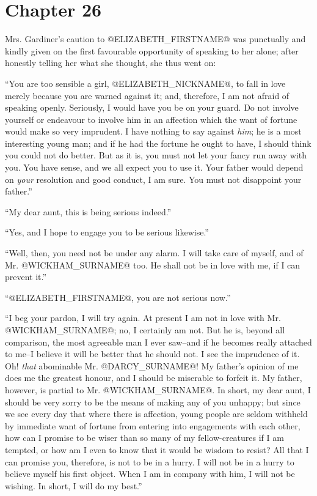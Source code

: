 \chapter*{Chapter 26}


Mrs. Gardiner's caution to @ELIZABETH_FIRSTNAME@ was punctually and kindly given
on the first favourable opportunity of speaking to her alone; after
honestly telling her what she thought, she thus went on:

``You are too sensible a girl, @ELIZABETH_NICKNAME@, to fall in love merely because
you are warned against it; and, therefore, I am not afraid of speaking
openly. Seriously, I would have you be on your guard. Do not involve
yourself or endeavour to involve him in an affection which the want
of fortune would make so very imprudent. I have nothing to say against
\textit{him}; he is a most interesting young man; and if he had the fortune he
ought to have, I should think you could not do better. But as it is, you
must not let your fancy run away with you. You have sense, and we all
expect you to use it. Your father would depend on \textit{your} resolution and
good conduct, I am sure. You must not disappoint your father.''

``My dear aunt, this is being serious indeed.''

``Yes, and I hope to engage you to be serious likewise.''

``Well, then, you need not be under any alarm. I will take care of
myself, and of Mr. @WICKHAM_SURNAME@ too. He shall not be in love with me, if I
can prevent it.''

``@ELIZABETH_FIRSTNAME@, you are not serious now.''

``I beg your pardon, I will try again. At present I am not in love with
Mr. @WICKHAM_SURNAME@; no, I certainly am not. But he is, beyond all comparison,
the most agreeable man I ever saw--and if he becomes really attached to
me--I believe it will be better that he should not. I see the imprudence
of it. Oh! \textit{that} abominable Mr. @DARCY_SURNAME@! My father's opinion of me does
me the greatest honour, and I should be miserable to forfeit it. My
father, however, is partial to Mr. @WICKHAM_SURNAME@. In short, my dear aunt, I
should be very sorry to be the means of making any of you unhappy; but
since we see every day that where there is affection, young people
are seldom withheld by immediate want of fortune from entering into
engagements with each other, how can I promise to be wiser than so many
of my fellow-creatures if I am tempted, or how am I even to know that it
would be wisdom to resist? All that I can promise you, therefore, is not
to be in a hurry. I will not be in a hurry to believe myself his first
object. When I am in company with him, I will not be wishing. In short,
I will do my best.''

